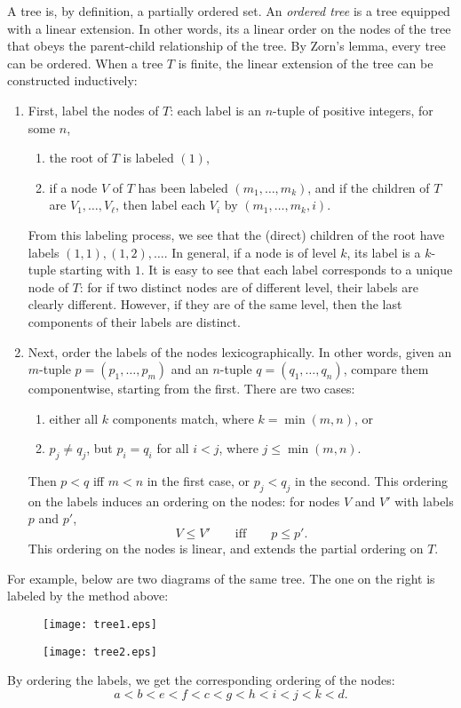 \documentclass[12pt]{article}
\begin{document}
A tree is, by definition, a partially ordered set.  An \emph{ordered tree} is a tree equipped with a linear extension.  In other words, its a linear order on the nodes of the tree that obeys the parent-child relationship of the tree.  By Zorn's lemma, every tree can be ordered.  When a tree $T$ is finite, the linear extension of the tree can be constructed inductively:
\begin{enumerate}
\item First, label the nodes of $T$: each label is an $n$-tuple of positive integers, for some $n$,
\begin{enumerate}
\item the root of $T$ is labeled $(1)$,
\item if a node $V$ of $T$ has been labeled $(m_1,\ldots,m_k)$, and if the children of $T$ are $V_1,\ldots, V_{\ell}$, then label each $V_i$ by $(m_1,\ldots, m_k, i)$.
\end{enumerate}
From this labeling process, we see that the (direct) children of the root have labels $(1,1),(1,2),\ldots $.  In general, if a node is of level $k$, its label is a $k$-tuple starting with $1$.  It is easy to see that each label corresponds to a unique node of $T$: for if two distinct nodes are of different level, their labels are clearly different.  However, if they are of the same level, then the last components of their labels are distinct.
\item
Next, order the labels of the nodes lexicographically.  In other words, given an $m$-tuple $p=(p_1,\ldots, p_m)$ and an $n$-tuple $q=(q_1,\ldots, q_n)$, compare them componentwise, starting from the first.  There are two cases:
\begin{enumerate}
\item either all $k$ components match, where $k=\min(m,n)$, or
\item $p_j\ne q_j$, but $p_i=q_i$ for all $i<j$, where $j\le \min(m,n)$.
\end{enumerate}
Then $p<q$ iff $m< n$ in the first case, or $p_j< q_j$ in the second.  This ordering on the labels induces an ordering on the nodes: for nodes $V$ and $V'$ with labels $p$ and $p'$, $$V\le V' \qquad \mbox{iff} \qquad p\le p'.$$
This ordering on the nodes is linear, and extends the partial ordering on $T$.
\end{enumerate}

For example, below are two diagrams of the same tree.  The one on the right is labeled by the method above:
\begin{figure}[htp]
  \centering
    \begin{minipage}[t]{0.58\linewidth}
      \texttt{[image: tree1.eps]}
    \end{minipage}
\hspace{-2.5cm}
    \begin{minipage}[t]{0.38\linewidth}
      \texttt{[image: tree2.eps]}
    \end{minipage}
\end{figure}

By ordering the labels, we get the corresponding ordering of the nodes:
$$ a < b < e < f < c < g < h < i < j < k < d.$$
\end{document}
